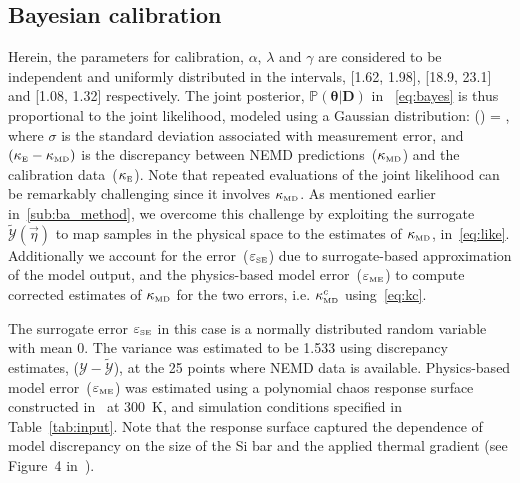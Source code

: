 \subsection{Bayesian calibration}
\label{sub:ba}

Herein, the parameters for calibration, $\alpha$, $\lambda$ and $\gamma$ are considered to be independent and
uniformly distributed in the intervals, [1.62, 1.98], [18.9, 23.1] and [1.08, 1.32] respectively.
The joint posterior, $\mathbb{P}(\bm{\theta}\vert \bm{D})$ in ~\eqref{eq:bayes} is thus 
proportional to the joint likelihood, modeled using a Gaussian distribution:
%
\be
{}(\vert\bm{\theta}) = \exp{},
\label{eq:like}
\ee
%
\noindent where $\sigma$ is the standard deviation associated with measurement error, and
$(\kappa_{\tiny{\mbox{E}}} - \kappa_{\tiny{\mbox{MD}}})$ is the discrepancy between 
NEMD predictions~($\kappa_{\tiny{\mbox{MD}}}$) and the calibration data~($\kappa_{\tiny{\mbox{E}}}$). 
Note that repeated evaluations of the joint likelihood can be remarkably challenging since it involves 
$\kappa_{\tiny{\mbox{MD}}}$. As mentioned earlier in~\ref{sub:ba_method}, we overcome this challenge by
exploiting the surrogate
$\tilde{\mathcal{Y}}(\vec{\eta})$ to map samples in the physical space to the estimates of 
$\kappa_{\tiny{\mbox{MD}}}$, in~\eqref{eq:like}. Additionally we account for the 
error~($\varepsilon_\text{\tiny{SE}}$) due to
surrogate-based approximation of the model output, and the physics-based model
error~($\varepsilon_\text{\tiny{ME}}$) to compute corrected estimates of 
$\kappa_{\tiny{\mbox{MD}}}$ for the two errors, i.e. $\kappa_{\tiny{\mbox{MD}}}^c$
using~\eqref{eq:kc}.

The surrogate error $\varepsilon_\text{\tiny{SE}}$ in this case is a normally distributed random
variable with mean 0. The variance was estimated to be 1.533 using discrepancy estimates, 
($\mathcal{Y}-\tilde{\mathcal{Y}}$), at the 25 points where NEMD data is available.  
Physics-based model error~($\varepsilon_\text{\tiny{ME}}$) was estimated using a polynomial chaos
response surface constructed in~\cite{Vohra:2018a} at 
300~K, and simulation conditions specified in Table~\ref{tab:input}. Note that the response surface
captured the dependence of model discrepancy on the size of the Si bar and the applied thermal gradient
(see Figure~4 in~\cite{Vohra:2018a}).

